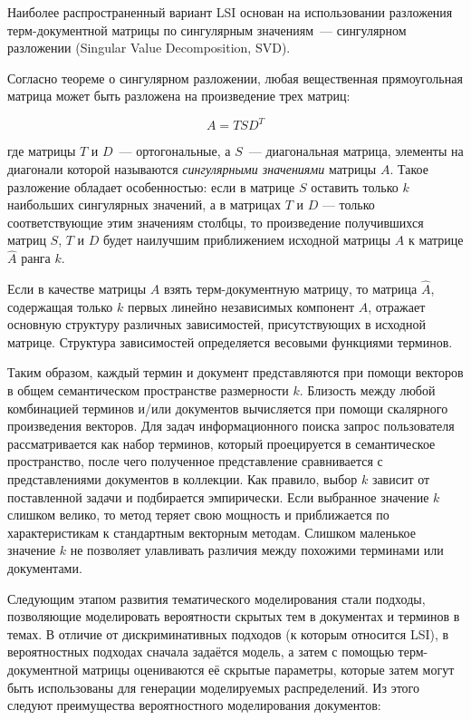 Наиболее распространенный вариант LSI основан на использовании разложения терм-документной матрицы по сингулярным значениям~--- сингулярном разложении (Singular Value Decomposition, SVD). 


Согласно теореме о сингулярном разложении, любая вещественная прямоугольная матрица может быть разложена на произведение трех матриц:

\begin{equation}\label{}
A=TSD^T
\end{equation}

где матрицы $T$ и $D$~--- ортогональные, а $S$~--- диагональная матрица, элементы на диагонали которой называются \textit{сингулярными значениями} матрицы $A$. Такое разложение обладает особенностью: если в матрице $S$ оставить только $k$ наибольших сингулярных значений, а в матрицах $T$ и $D$ — только соответствующие этим значениям столбцы, то произведение получившихся матриц $S$, $T$ и $D$ будет наилучшим приближением исходной матрицы $A$ к матрице $\widehat{A}$ ранга $k$. 

Если в качестве матрицы $A$ взять терм-документную матрицу, то матрица $\widehat{A}$, содержащая только $k$ первых линейно независимых компонент $A$, отражает основную структуру различных зависимостей, присутствующих в исходной матрице. Структура зависимостей определяется весовыми функциями терминов.

Таким образом, каждый термин и документ представляются при помощи векторов в общем семантическом пространстве размерности $k$. Близость между любой комбинацией терминов и/или документов вычисляется при помощи скалярного произведения векторов. Для задач информационного поиска запрос пользователя рассматривается как набор терминов, который проецируется в семантическое пространство, после чего полученное представление сравнивается с представлениями документов в коллекции. Как правило, выбор $k$ зависит от поставленной задачи и подбирается эмпирически. Если выбранное значение $k$ слишком велико, то метод теряет свою мощность и приближается по характеристикам к стандартным векторным методам. Слишком маленькое значение $k$ не позволяет улавливать различия между похожими терминами или документами. 

Следующим этапом развития тематического моделирования стали подходы, позволяющие моделировать вероятности скрытых тем в документах и терминов в темах. В отличие от дискриминативных подходов (к которым относится LSI), в вероятностных подходах сначала задаётся модель, а затем с помощью терм-документной матрицы оцениваются её скрытые параметры, которые затем могут быть использованы для генерации моделируемых распределений. Из этого следуют преимущества вероятностного моделирования документов:


